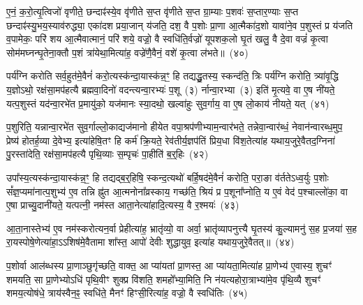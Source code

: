 ए॒नं॒ क॒रो॒त्यृ॒त्विजो॑ वृणीते॒ छन्दाꣴ॑स्ये॒व वृ॑णीते स॒प्त वृ॑णीते स॒प्त ग्रा॒म्याः प॒शवः॑ स॒प्तार॒ण्याः स॒प्त छन्दाꣴ॑स्यु॒भय॒स्याव॑रुद्ध्या॒ एका॑\-दश प्रया॒जान् य॑जति॒ दश॒ वै प॒शोः प्रा॒णा आ॒त्मैका॑द॒शो यावा॑ने॒व प॒शुस्तं प्र य॑जति व॒पामेकः॒ परि॑ शय आ॒त्मैवात्मानं॒ परि॑ शये॒ वज्रो॒ वै स्वधि॑ति॒र्वज्रो॑ यूपशक॒लो घृ॒तं खलु॒ वै दे॒वा वज्रं॑ कृ॒त्वा सोम॑मघ्नन्घृ॒तेना॒क्तौ प॒शं त्रा॑येथा॒मित्या॑ह॒ वज्रे॑णै॒वैनं॒ वशे॑ कृ॒त्वा ल॑भते॥~(४०)

{\anuvakamend[{आ॒घा॒रं प॑द्यन्ते॒ द्वाद॑शा॒त्मन्ने॒व य॒ज्ञस्य॒ मेध्य॑मे॒व खलु॒ वा अ॒ष्टाद॑श च}]}%

पर्य॑ग्नि करोति सर्व॒हुत॑मे॒वैनं॑ करो॒त्यस्क॑न्दा॒यास्क॑न्न॒ꣳ॒ हि तद्यद्धु॒तस्य॒ स्कन्द॑ति॒ त्रिः पर्य॑ग्नि करोति॒ त्र्या॑वृ॒द्धि य॒ज्ञो\-ऽथो॒ रक्ष॑सा॒मप॑हत्यै ब्रह्मवा॒दिनो॑ वदन्त्यन्वा॒रभ्यः॑ प॒शू~(३) र्नान्वा॒रभ्या~(३) इति॑ मृ॒त्यवे॒ वा ए॒ष नी॑यते॒ यत्प॒शुस्तं यद॑न्वा॒रभे॑त प्र॒मायु॑को॒ यज॑मानः स्या॒दथो॒ खल्वा॑हुः सुव॒र्गाय॒ वा ए॒ष लो॒काय॑ नीयते॒ यत्~(४१)

प॒शुरिति॒ यन्नान्वा॒रभे॑त सुव॒र्गाल्लो॒काद्यज॑मानो हीयेत वपा॒श्रप॑णीभ्याम॒न्वार॑भते॒ तन्नेवा॒न्वार॑ब्धं॒ नेवान॑न्वारब्ध॒मुप॒ प्रेष्य॑ होतर्\mbox{}ह॒व्या दे॒वेभ्य॒ इत्या॑हेषि॒तꣳ हि कर्म॑ क्रि॒यते॒ रेव॑तीर्य॒ज्ञप॑तिं प्रिय॒धा वि॑श॒तेत्या॑ह यथाय॒जुरे॒वैतद॒ग्निना॑ पु॒रस्ता॑देति॒ रक्ष॑सा॒मप॑हत्यै पृथि॒व्याः स॒म्पृचः॑ पा॒हीति॑ ब॒र्॒\mbox{}हिः~(४२)

उपा᳚स्य॒त्यस्क॑न्दा॒यास्क॑न्न॒ꣳ॒ हि तद्यद्ब॒र्॒\mbox{}हिषि॒ स्कन्द॒त्यथो॑ बर्\mbox{}हि॒षद॑मे॒वैनं॑ करोति॒ परा॒ङा व॑र्तते\-ऽध्व॒र्युः प॒शोः सं᳚ज्ञ॒प्यमा॑नात्प॒शुभ्य॑ ए॒व तन्नि ह्नु॑त आ॒त्मनोना᳚व्रस्काय॒ गच्छ॑ति॒ श्रियं प्र प॒शूना᳚प्नोति॒ य ए॒वं वेद॑ प॒श्चाल्लो॑का॒ वा ए॒षा प्राच्यु॒दानी॑यते॒ यत्पत्नी॒ नम॑स्त आता॒नेत्या॑हादि॒त्यस्य॒ वै र॒श्मयः॑~(४३)

आ॒ता॒नास्तेभ्य॑ ए॒व नम॑स्करोत्यन॒र्वा प्रेहीत्या॑ह॒ भ्रातृ॑व्यो॒ वा अर्वा॒ भ्रातृ॑व्यापनुत्त्यै घृ॒तस्य॑ कु॒ल्यामनु॑ स॒ह प्र॒जया॑ स॒ह रा॒यस्पोषे॒णेत्या॑हा॒\-ऽऽ\-शिष॑मे॒वैतामा शा᳚स्त॒ आपो॑ देवीः शुद्धायुव॒ इत्या॑ह यथाय॒जुरे॒वैतत्॥~(४४)

{\anuvakamend[{लो॒काय॑ नीयते॒ यद्ब॒र्॒\mbox{}ही र॒श्मयः॑ स॒प्तत्रिꣳ॑शच्च}]}%

प॒शोर्वा आल॑ब्धस्य प्रा॒णाञ्छुगृ॑च्छति॒ वाक्त॒ आ प्या॑यतां प्रा॒णस्त॒ आ प्या॑यता॒मित्या॑ह प्रा॒णेभ्य॑ ए॒वास्य॒ शुचꣳ॑ शमयति॒ सा प्रा॒णेभ्यो\-ऽधि॑ पृथि॒वीꣳ शुक्प्र वि॑शति॒ शमहो᳚भ्या॒मिति॒ नि न॑यत्यहोरा॒त्राभ्या॑मे॒व पृ॑थि॒व्यै शुचꣳ॑ शमय॒त्योष॑धे॒ त्राय॑स्वैन॒ꣴ॒ स्वधि॑ते॒ मैनꣳ॑ हिꣳसी॒रित्या॑ह॒ वज्रो॒ वै स्वधि॑तिः~(४५)

